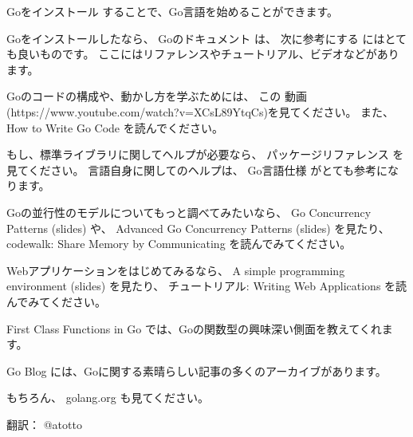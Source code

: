 Goをインストール することで、Go言語を始めることができます。

Goをインストールしたなら、 Goのドキュメント は、 次に参考にする
にはとても良いものです。 ここにはリファレンスやチュートリアル、ビデオなどがあります。

Goのコードの構成や、動かし方を学ぶためには、 この
動画(https:\//\//www.youtube.com\//watch?v=XCsL89YtqCs)を見てください。
また、 How to Write Go Code を読んでください。

もし、標準ライブラリに関してヘルプが必要なら、 パッケージリファレンス を見てください。 言語自身に関してのヘルプは、 Go言語仕様 がとても参考になります。

Goの並行性のモデルについてもっと調べてみたいなら、 Go Concurrency Patterns (slides) や、 Advanced Go Concurrency Patterns (slides) を見たり、 codewalk: Share Memory by Communicating を読んでみてください。

Webアプリケーションをはじめてみるなら、 A simple programming environment (slides) を見たり、 チュートリアル: Writing Web Applications を読んでみてください。

First Class Functions in Go では、Goの関数型の興味深い側面を教えてくれます。

Go Blog には、Goに関する素晴らしい記事の多くのアーカイブがあります。

もちろん、 golang.org も見てください。

翻訳： @atotto